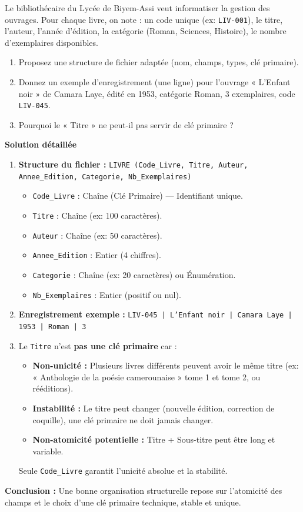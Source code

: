 \documentclass[11pt]{article}
\begin{document}
\begin{exoresolu}
    Le bibliothécaire du Lycée de Biyem-Assi veut informatiser la gestion des ouvrages. Pour chaque livre, on note : un code unique (ex: \texttt{LIV-001}), le titre, l'auteur, l'année d'édition, la catégorie (Roman, Sciences, Histoire), le nombre d'exemplaires disponibles.
    \begin{enumerate}
        \item Proposez une structure de fichier adaptée (nom, champs, types, clé primaire).
        \item Donnez un exemple d'enregistrement (une ligne) pour l'ouvrage « L'Enfant noir » de Camara Laye, édité en 1953, catégorie Roman, 3 exemplaires, code \texttt{LIV-045}.
        \item Pourquoi le « Titre » ne peut-il pas servir de clé primaire ?
    \end{enumerate}
    \tcblower
    \textbf{Solution détaillée}
    \begin{enumerate}
        \item \textbf{Structure du fichier :}
        \texttt{LIVRE (Code\_Livre, Titre, Auteur, Annee\_Edition, Categorie, Nb\_Exemplaires)}
        \begin{itemize}
            \item \texttt{Code\_Livre} : Chaîne (Clé Primaire) — Identifiant unique.
            \item \texttt{Titre} : Chaîne (ex: 100 caractères).
            \item \texttt{Auteur} : Chaîne (ex: 50 caractères).
            \item \texttt{Annee\_Edition} : Entier (4 chiffres).
            \item \texttt{Categorie} : Chaîne (ex: 20 caractères) ou Énumération.
            \item \texttt{Nb\_Exemplaires} : Entier (positif ou nul).
        \end{itemize}
        \item \textbf{Enregistrement exemple :}
        \texttt{LIV-045 | L'Enfant noir | Camara Laye | 1953 | Roman | 3}
        \item Le \texttt{Titre} n'est \textbf{pas une clé primaire} car :
        \begin{itemize}
            \item \textbf{Non-unicité :} Plusieurs livres différents peuvent avoir le même titre (ex: « Anthologie de la poésie camerounaise » tome 1 et tome 2, ou rééditions).
            \item \textbf{Instabilité :} Le titre peut changer (nouvelle édition, correction de coquille), une clé primaire ne doit jamais changer.
            \item \textbf{Non-atomicité potentielle :} Titre + Sous-titre peut être long et variable.
        \end{itemize}
        Seule \texttt{Code\_Livre} garantit l'unicité absolue et la stabilité.
    \end{enumerate}
    \textbf{Conclusion :} Une bonne organisation structurelle repose sur l'atomicité des champs et le choix d'une clé primaire technique, stable et unique.
\end{exoresolu}
\end{document}
